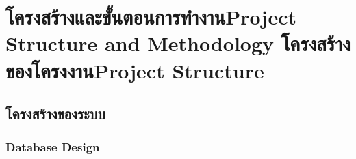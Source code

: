\chapter{\ifproject%
\ifcpe โครงสร้างและขั้นตอนการทำงาน\else Project Structure and Methodology\fi
\else%
\ifcpe โครงสร้างของโครงงาน\else Project Structure\fi
\fi
}



\section{โครงสร้างของระบบ}



\subsection{Database Design}

